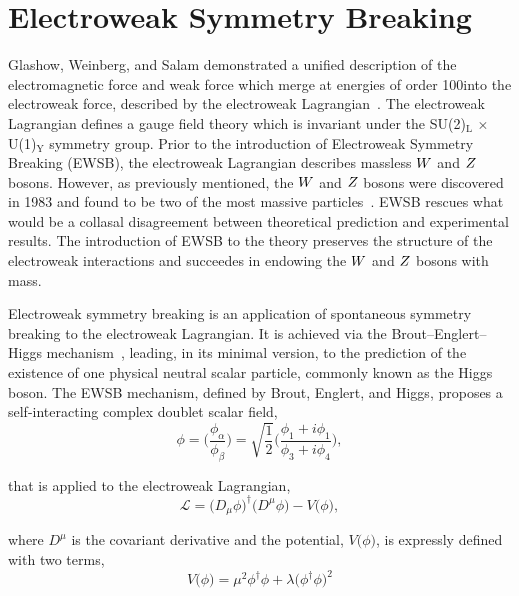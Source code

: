 \section{Electroweak Symmetry Breaking}
Glashow, Weinberg, and Salam demonstrated a unified description of the electromagnetic force 
and weak force which merge at energies of order 100\GeV into the electroweak force,
described by the electroweak Lagrangian~\cite{Glashow:1961tr,SM1,SM3}.
The electroweak Lagrangian defines a gauge field theory which is 
invariant under the SU(2)$_{\text{L}} \, \times \, $U(1)$_{\text{Y}}$ symmetry group. 
Prior to the introduction of Electroweak Symmetry Breaking (EWSB),
the electroweak Lagrangian describes massless $W$ and $Z$ bosons.
However, as previously mentioned, the $W$ and $Z$ bosons were discovered in 1983
and found to be two of the most massive particles~\cite{AUBERT1983275,1983398}. 
EWSB rescues what would be a collasal disagreement between theoretical prediction
and experimental results. The introduction of EWSB to the theory preserves the structure of
the electroweak interactions and succeedes in endowing the $W$ and $Z$ bosons
with mass.

Electroweak symmetry breaking is an application of spontaneous symmetry breaking to
the electroweak Lagrangian. It is achieved via the Brout--Englert--Higgs
mechanism~\cite{Englert:1964et,Higgs:1964ia,Higgs:1964pj,Guralnik:1964eu,Higgs:1966ev,Kibble:1967sv},
leading, in its minimal version, to the prediction of the existence of one physical neutral scalar particle,
commonly known as the Higgs boson. The EWSB mechanism, defined by Brout, Englert, and Higgs,
proposes a self-interacting complex doublet scalar field,
\begin{equation}
\phi = \Bigg(\frac{\phi_{\alpha}}{\phi_{\beta}}\Bigg) = 
    \sqrt{\frac{1}{2}} \Bigg(\frac{\phi_{1} + i\phi_{1}}{\phi_{3} + i\phi_{4}}\Bigg),
\label{eqn:phi_doublet}
\end{equation}

that is applied to the electroweak Lagrangian, 
\begin{equation}
\mathcal{L} = \big(D_{\mu}\phi\big)^{\dagger} \big(D^{\mu}\phi\big) - V\big(\phi\big),
\end{equation}

where $D^{\mu}$ is the covariant derivative and the potential, $V\big(\phi\big)$, 
is expressly defined with two terms, 
\begin{equation}
V\big(\phi\big) = \mu^{2}\phi^{\dagger}\phi + \lambda\big(\phi^{\dagger}\phi\big)^{2}
\label{eqn:v_pot}
\end{equation}

